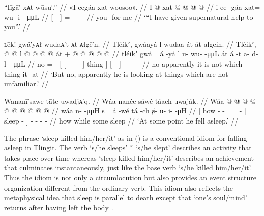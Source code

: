 \ex\label{ex:90-17-supernatural-help}%
%
\begingl
	\glpreamble	“Iīg̣ā′ xᴀt wūsu′.” //
	\glpreamble	«\!I eeg̱áa x̱at woosoo\!». //
	\gla	{} I  @ {} {}
		x̱at @  @ {} @ {} @ {} //
	\glb	{} i ee -g̱áa {}
		x̱at= wu- i-  -μμL //
	\glc	{}[   - {}]
		= - -  - //
	\gld	{} you {} -for {}
		me  {} {} {} //
	\glft	‘“I have given supernatural help to you”.’
		//
\endgl
\xe

\ex\label{ex:90-18-unfamiliar}%
%
\begingl
	\glpreamble	 ʟēk! gwâ′yᴀł wudaᴀ′t ᴀt ᴀłg̣ē′n. //
	\glpreamble	Tléikʼ, gwáayá l wudaa át át alg̱ein. //
	\gla	Tléikʼ,  @ {} @ {}
		{} {} l  @ {} @ {} @ {} @ {} {} át {} +
		{}  @ {} {}
		 @ {} @ {} @ {} @ {} //
	\glb	tléikʼ gwá= á -yá
		{} {} l u- wu-  -μμL {} {} át {}
		{} á -t {} 
		a- d- l-  -μμL  //
	\glc	no =  -
		{}[ {}[  - -  - \· {}] thing {}]
		{}[  - {}]
		- - -  - //
	\gld	no apparently\· it is
		{} {} not  {} {} {} \·which {} thing {}
		{} it -at {}
		 {} {} {} {} //
	\glft	‘But no, apparently he is looking at things which are not unfamiliar.’
		//
\endgl
\xe

\ex\label{ex:90-19-sleep-kills}%
%
\begingl
	\glpreamble	Wananī′sawe tātc uwadjᴀ′q. //
	\glpreamble	Wáa nanée sáwé táach uwajáḵ. //
	\gla	{} Wáa  @ {} @ {} @ {} {}
		 @ {} @ {}
		{}  @ {} {}
		 @ {} @ {} @ {} @ {} //
	\glb	{} wáa n-  -μμH {} {} 
		s= á -wé
		{} tá -ch {}
		ⱥ- u- i-  -μH //
	\glc	{}[ how -  - \· {}]
		=  -
		{}[ sleep - {}]
		- - -  - //
	\gld	{} how  {} {} \·while {}
		some\·  {}
		{} sleep {} {}
		 {} {} {} {} //
	\glft	‘At some point he fell asleep.’
		//
\endgl
\xe

The phrase  ‘sleep killed him/her/it’ as in (\lastx) is a conventional idiom for falling asleep in Tlingit.
The verb  ‘s/he sleeps’ \~\  ‘s/he slept’ describes an activity that takes place over time whereas  ‘sleep killed him/her/it’ describes an achievement that culminates instantaneously, just like the base verb  ‘s/he killed him/her/it’.
Thus the idiom is not only a circumlocution but also provides an event structure organization different from the ordinary verb.
This idiom also reflects the  metaphysical idea that sleep is parallel to death except that  ‘one’s soul/mind’ returns after having left the body \parencites[759]{de-laguna:1972}[56, 105]{kan:2016}.

